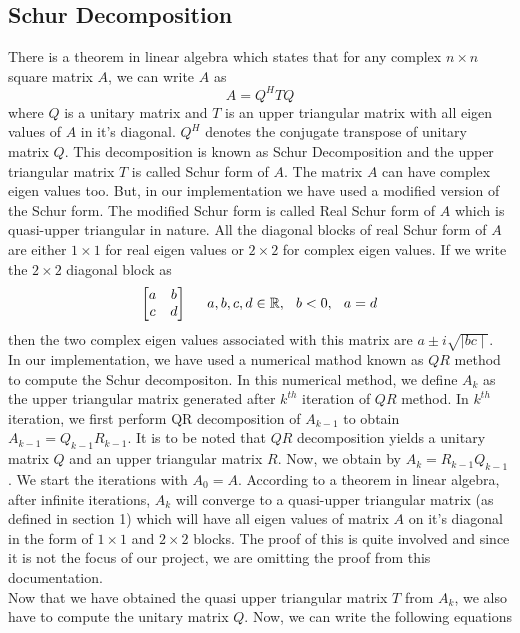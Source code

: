 \documentclass[12pt,a4paper]{article}
\begin{document}
\subsection{Schur Decomposition}

There is a theorem in linear algebra which states that for any complex $n \times n$ square matrix $A$, we can write $A$ as
$$A = Q^{H}TQ$$
where $Q$ is a unitary matrix and $T$ is an upper triangular matrix with all eigen values of $A$ in it's diagonal. $Q^{H}$ denotes the conjugate transpose of unitary matrix $Q$. This decomposition is known as Schur Decomposition and the upper triangular matrix $T$ is called Schur form of $A$. The matrix $A$ can have complex eigen values too. But, in our implementation we have used a modified version of the Schur form. The modified Schur form is called Real Schur form of $A$ which is quasi-upper triangular in nature. All the diagonal blocks of real Schur form of $A$ are either $1 \times 1$ for real eigen values or $2 \times 2$ for complex eigen values. If we write the $2 \times 2$ diagonal block as 
$$\begin{bmatrix}a & b \\ c & d \end{bmatrix} \hspace{0.5cm}  a, b, c, d \in \mathbb{R},\hspace{0.25cm} b < 0, \hspace{0.25cm} a = d$$
then the two complex eigen values associated with this matrix are $a \pm i\sqrt{\mid bc \mid}$. \\ In our implementation, we have used a numerical mathod known as $QR$ method to compute the Schur decompositon. In this numerical method, we define $A_{k}$ as the upper triangular matrix generated after $k^{th}$ iteration of $QR$ method. In $k^{th}$ iteration, we first perform QR decomposition of $A_{k-1}$ to obtain $A_{k-1} = Q_{k-1}R_{k-1}$. It is to be noted that $QR$ decomposition yields a unitary matrix $Q$ and an upper triangular matrix $R$. Now, we obtain by $A_{k} = R_{k-1}Q_{k-1}$. We start the iterations with $A_{0} = A$. According to a theorem in linear algebra, after infinite iterations, $A_{k}$ will converge to a quasi-upper triangular matrix (as defined in section 1) which will have all eigen values of matrix $A$ on it's diagonal in the form of $1 \times 1$ and $2 \times 2$ blocks. The proof of this is quite involved and since it is not the focus of our project, we are omitting the proof from this documentation. \\ Now that we have obtained the quasi upper triangular matrix $T$ from $A_{k}$, we also have to compute the unitary matrix $Q$. Now, we can write the following equations
\end{document}
